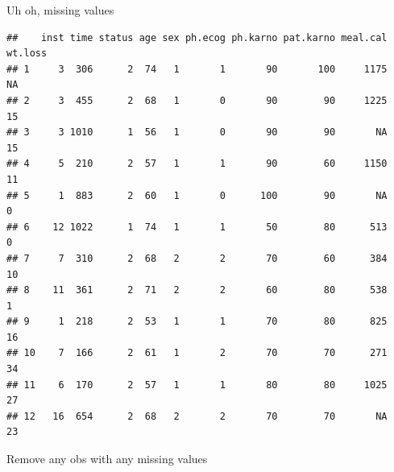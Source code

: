 \begin{frame}[fragile]{Uh oh, missing values}
  
  \begin{scriptsize}
\begin{knitrout}
\color{fgcolor}\begin{kframe}
\begin{alltt}
\hlstd{)}
\end{alltt}
\begin{verbatim}
##    inst time status age sex ph.ecog ph.karno pat.karno meal.cal wt.loss
## 1     3  306      2  74   1       1       90       100     1175      NA
## 2     3  455      2  68   1       0       90        90     1225      15
## 3     3 1010      1  56   1       0       90        90       NA      15
## 4     5  210      2  57   1       1       90        60     1150      11
## 5     1  883      2  60   1       0      100        90       NA       0
## 6    12 1022      1  74   1       1       50        80      513       0
## 7     7  310      2  68   2       2       70        60      384      10
## 8    11  361      2  71   2       2       60        80      538       1
## 9     1  218      2  53   1       1       70        80      825      16
## 10    7  166      2  61   1       2       70        70      271      34
## 11    6  170      2  57   1       1       80        80     1025      27
## 12   16  654      2  68   2       2       70        70       NA      23
\end{verbatim}
\end{kframe}
\end{knitrout}
  \end{scriptsize}
  
\end{frame}

\begin{frame}[fragile]{Remove any obs with any missing values}
  

  
\begin{knitrout}
\color{fgcolor}
\end{knitrout}
  
\end{frame}

